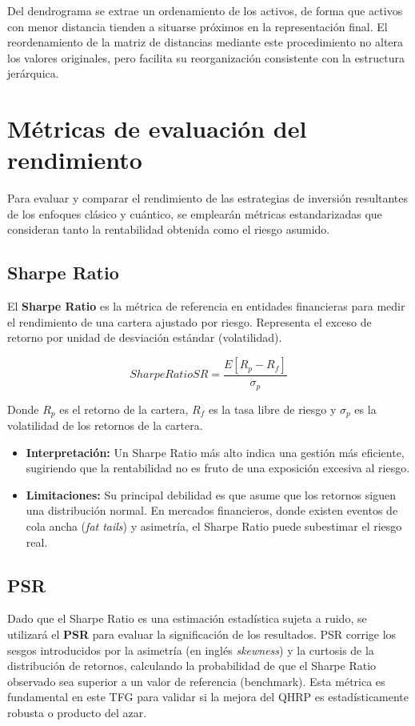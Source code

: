 Del dendrograma se extrae un ordenamiento de los activos, de forma que activos con menor distancia tienden a situarse próximos en la representación final. El reordenamiento de la matriz de distancias mediante este procedimiento no altera los valores originales, pero facilita su reorganización consistente con la estructura jerárquica.

\section{Métricas de evaluación del rendimiento}
\label{sec:metricas_evaluacion}
Para evaluar y comparar el rendimiento de las estrategias de inversión resultantes de los enfoques clásico y cuántico, se emplearán métricas estandarizadas que consideran tanto la rentabilidad obtenida como el riesgo asumido.

\subsection{Sharpe Ratio}
\label{subsec:sharpe_ratio}
El \textbf{Sharpe Ratio} es la métrica de referencia en entidades financieras para medir el rendimiento de una cartera ajustado por riesgo. Representa el exceso de retorno por unidad de desviación estándar (volatilidad).

\begin{equation}[eq:sharpe_ratio]{Sharpe Ratio}
    SR = \frac{E[R_p - R_f]}{\sigma_p}
\end{equation}

Donde $R_p$ es el retorno de la cartera, $R_f$ es la tasa libre de riesgo y $\sigma_p$ es la volatilidad de los retornos de la cartera.

\begin{itemize}
    \item \textbf{Interpretación:} Un Sharpe Ratio más alto indica una gestión más eficiente, sugiriendo que la rentabilidad no es fruto de una exposición excesiva al riesgo.
    \item \textbf{Limitaciones:} Su principal debilidad es que asume que los retornos siguen una distribución normal. En mercados financieros, donde existen eventos de cola ancha (\textit{fat tails}) y asimetría, el Sharpe Ratio puede subestimar el riesgo real.
\end{itemize}

\subsection{PSR}
\label{subsec:probabilistic_sharpe_ratio}
Dado que el Sharpe Ratio es una estimación estadística sujeta a ruido, se utilizará el \textbf{\gls{PSR}} para evaluar la significación de los resultados. \gls{PSR} corrige los sesgos introducidos por la asimetría (en inglés \textit{skewness}) y la curtosis de la distribución de retornos, calculando la probabilidad de que el Sharpe Ratio observado sea superior a un valor de referencia (benchmark). Esta métrica es fundamental en este TFG para validar si la mejora del \gls{QHRP} es estadísticamente robusta o producto del azar.

